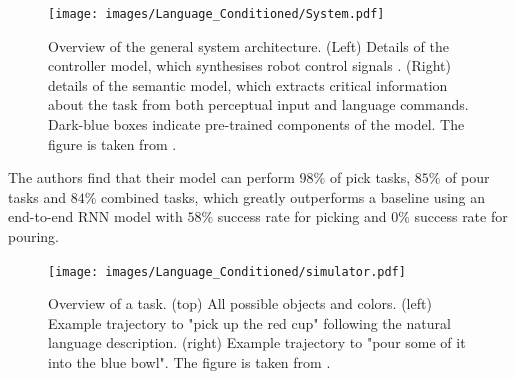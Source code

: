 \begin{figure}[htbp]
    \centering
    \texttt{[image: images/Language\_Conditioned/System.pdf]}
    \caption{Overview of the general system architecture. (Left) Details of the controller model, which
    synthesises robot control signals . (Right) details of the semantic model, which extracts critical
    information about the task from both perceptual input and language commands. Dark-blue boxes
    indicate pre-trained components of the model. The figure is taken from \cite{stepputtis2020languageconditioned}.}
    \label{language_imitation}
\end{figure}

The authors find that their model can perform $98 \%$ of pick tasks, $85 \%$ of pour tasks and $84 \%$ combined 
tasks, which greatly outperforms a baseline using an end-to-end RNN model with $58\%$ success rate for picking and $0 \%$ success rate for pouring.

\begin{figure}[htbp]
    \centering
    \texttt{[image: images/Language\_Conditioned/simulator.pdf]}
    \caption{Overview of a task. (top) All possible objects and colors. (left) Example trajectory to "pick up the red cup" following the natural language description. 
    (right) Example trajectory to "pour some of it into the blue bowl". The figure is taken from \cite{stepputtis2020languageconditioned}.}
    \label{lang_imi_expl}
\end{figure}
